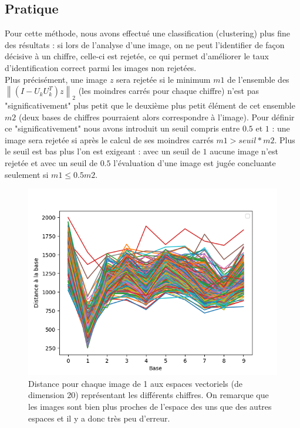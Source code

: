 \documentclass[a4paper,11pt,twoside]{report}
\newcommand{\norm}[1]{\left\lVert#1\right\rVert} %
\begin{document}
\subsection{Pratique}

Pour cette méthode, nous avons effectué une classification (clustering) plus fine des résultats : si lors de l'analyse d'une image, on ne peut l'identifier de façon décisive à un chiffre, celle-ci est rejetée, ce qui permet d'améliorer le taux d'identification correct parmi les images non rejetées. \\
Plus précisément, une image $z$ sera rejetée si le minimum $m1$ de l'ensemble des $ \norm{(I-U_{k}U_{k}^{T})z}_{2}$ (les moindres carrés pour chaque chiffre) n'est pas "significativement" plus petit que le deuxième plus petit élément de cet ensemble $m2$ (deux bases de chiffres pourraient alors correspondre à l'image). Pour définir ce "significativement" nous avons introduit un seuil compris entre $0.5$ et $1$ : une image sera rejetée si après le calcul de ses moindres carrés $m1>seuil*m2$. Plus le seuil est bas plus l'on est exigeant : avec un seuil de $1$ aucune image n'est rejetée et avec un seuil de $0.5$ l'évaluation d'une image est jugée concluante seulement si $m1\leq 0.5m2$.


\begin{figure}[H]
\begin{center}
  	\includegraphics[width=0.7\linewidth]{Graphs/Distance_bases_20_1.png}
  	\caption{Distance pour chaque image de 1 aux espaces vectoriels (de dimension 20) représentant les différents chiffres. On remarque que les images sont bien plus proches de l'espace des uns que des autres espaces et il y a donc très peu d'erreur.}
  	\end{center}
\end{figure}
\end{document}
